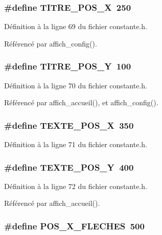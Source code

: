 \subsubsection{\setlength{\rightskip}{0pt plus 5cm}\#define TITRE\_\-POS\_\-X~250}\label{constante_8h_ea54698aac044d7c5e82a08df540d7ce}




D\'{e}finition \`{a} la ligne 69 du fichier constante.h.

R\'{e}f\'{e}renc\'{e} par affich\_\-config().
\subsubsection{\setlength{\rightskip}{0pt plus 5cm}\#define TITRE\_\-POS\_\-Y~100}\label{constante_8h_f10beda3e6ede3019bebb600479342ba}




D\'{e}finition \`{a} la ligne 70 du fichier constante.h.

R\'{e}f\'{e}renc\'{e} par affich\_\-accueil(), et affich\_\-config().
\subsubsection{\setlength{\rightskip}{0pt plus 5cm}\#define TEXTE\_\-POS\_\-X~350}\label{constante_8h_4ec78d5dc6fca74789f2936e384c3786}




D\'{e}finition \`{a} la ligne 71 du fichier constante.h.
\subsubsection{\setlength{\rightskip}{0pt plus 5cm}\#define TEXTE\_\-POS\_\-Y~400}\label{constante_8h_3ada5d5b16aa6d9464c3af03fe6b8b67}




D\'{e}finition \`{a} la ligne 72 du fichier constante.h.

R\'{e}f\'{e}renc\'{e} par affich\_\-accueil().
\subsubsection{\setlength{\rightskip}{0pt plus 5cm}\#define POS\_\-X\_\-FLECHES~500}\label{constante_8h_d13a4aca188b44c35c81cacf287b2c72}




